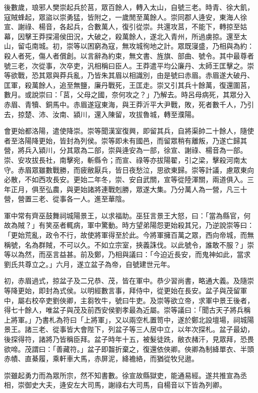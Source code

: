 \begin{pinyinscope}
後數歲，琅邪人樊崇起兵於莒，眾百餘人，轉入太山，自號三老。時青、徐大飢，寇賊蜂起，眾盜以崇勇猛，皆附之，一歲閒至萬餘人。崇同郡人逄安，東海人徐宣、謝祿、楊音，各起兵，合數萬人，復引從崇。共還攻莒，不能下，轉掠至姑幕，因擊王莽探湯侯田況，大破之，殺萬餘人，遂北入青州，所過虜掠。還至太山，留屯南城。初，崇等以困窮為寇，無攻城徇地之計。眾既寖盛，乃相與為約：殺人者死，傷人者償創。以言辭為約束，無文書、旌旗、部曲、號令。其中最尊者號三老，次從事，次卒吏，汎相稱曰臣人。王莽遣平均公廉丹、太師王匡擊之。崇等欲戰，恐其眾與莽兵亂，乃皆朱其眉以相識別，由是號曰赤眉。赤眉遂大破丹、匡軍，殺萬餘人，追至無鹽，廉丹戰死，王匡走。崇又引其兵十餘萬，復還圍莒，數月。或說崇曰：「莒，父母之國，奈何攻之？」乃解去。時呂母病死，其眾分入赤眉、青犢、銅馬中。赤眉遂寇東海，與王莽沂平大尹戰，敗，死者數千人，乃引去，掠楚、沛、汝南、潁川，還入陳留，攻拔魯城，轉至濮陽。

會更始都洛陽，遣使降崇。崇等聞漢室復興，即留其兵，自將渠帥二十餘人，隨使者至洛陽降更始，皆封為列侯。崇等即未有國邑，而留眾稍有離叛，乃遂亡歸其營，將兵入潁川，分其眾為二部，崇與逄安為一部，徐宣、謝祿、楊音為一部。崇、安攻拔長社，南擊宛，斬縣令；而宣、祿等亦拔陽翟，引之梁，擊殺河南太守。赤眉眾雖數戰勝，而疲敝厭兵，皆日夜愁泣，思欲東歸。崇等計議，慮眾東向必散，不如西攻長安。更始二年冬，崇、安自武關，宣等從陸渾關，兩道俱入。三年正月，俱至弘農，與更始諸將連戰剋勝，眾遂大集。乃分萬人為一營，凡三十營，營置三老、從事各一人。進至華陰。

軍中常有齊巫鼓舞祠城陽景王，以求福助。巫狂言景王大怒，曰：「當為縣官，何故為賊？」有笑巫者輒病，軍中驚動。時方望弟陽怨更始殺其兄，乃逆說崇等曰：「更始荒亂，政令不行，故使將軍得至於此。今將軍擁百萬之眾，西向帝城，而無稱號，名為群賊，不可以久。不如立宗室，挾義誅伐。以此號令，誰敢不服？」崇等以為然，而巫言益甚。前及鄭，乃相與議曰：「今迫近長安，而鬼神如此，當求劉氏共尊立之。」六月，遂立盆子為帝，自號建世元年。

初，赤眉過式，掠盆子及二兄恭、茂，皆在軍中。恭少習尚書，略通大義。及隨崇等降更始，即封為式侯。以明經數言事，拜侍中，從更始在長安。盆子與茂留軍中，屬右校卒吏劉俠卿，主芻牧牛，號曰牛吏。及崇等欲立帝，求軍中景王後者，得七十餘人，唯盆子與茂及前西安侯劉孝最為近屬。崇等議曰：「聞古天子將兵稱上將軍。」乃書札為符曰「上將軍」，又以兩空札置笥中，遂於鄭北設壇場，祠城陽景王。諸三老、從事皆大會陛下，列盆子等三人居中立，以年次探札。盆子最幼，後探得符，諸將乃皆稱臣拜。盆子時年十五，被髮徒跣，敝衣赭汗，見眾拜，恐畏欲啼。茂謂曰：「善藏符。」盆子即齧折棄之，復還依俠卿。俠卿為制絳單衣、半頭赤幘、直綦履，乘軒車大馬，赤屏泥，絳襜絡，而猶從牧兒遨。

崇雖起勇力而為眾所宗，然不知書數。徐宣故縣獄吏，能通易經。遂共推宣為丞相，崇御史大夫，逄安左大司馬，謝祿右大司馬，自楊音以下皆為列卿。


\end{pinyinscope}
